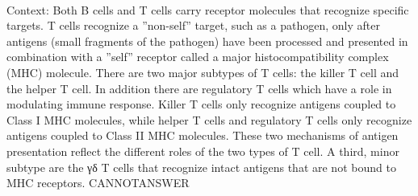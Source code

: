 \documentclass[11pt,a4paper, onecolumn]{article}
\begin{document}
\\ Context: Both B cells and T cells carry receptor molecules that recognize specific targets. T cells recognize a ''non-self'' target, such as a pathogen, only after antigens (small fragments of the pathogen) have been processed and presented in combination with a ''self'' receptor called a major histocompatibility complex (MHC) molecule. There are two major subtypes of T cells: the killer T cell and the helper T cell. In addition there are regulatory T cells which have a role in modulating immune response. Killer T cells only recognize antigens coupled to Class I MHC molecules, while helper T cells and regulatory T cells only recognize antigens coupled to Class II MHC molecules. These two mechanisms of antigen presentation reflect the different roles of the two types of T cell. A third, minor subtype are the γδ T cells that recognize intact antigens that are not bound to MHC receptors. CANNOTANSWER
\end{document}
